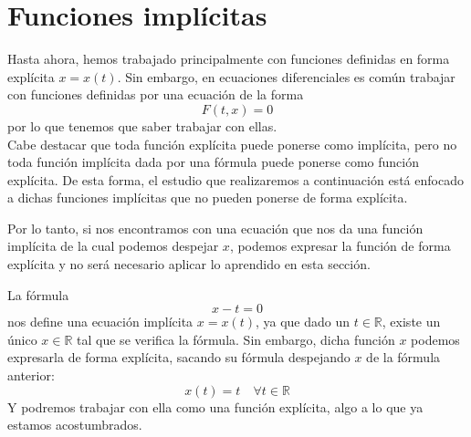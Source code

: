 \section{Funciones implícitas}
Hasta ahora, hemos trabajado principalmente con funciones definidas en forma explícita $x=x(t)$. Sin embargo, en ecuaciones diferenciales es común trabajar con funciones definidas por una ecuación de la forma
\begin{equation*}
    F(t,x) = 0
\end{equation*}
por lo que tenemos que saber trabajar con ellas.\\

Cabe destacar que toda función explícita puede ponerse como implícita, pero no toda función implícita dada por una fórmula puede ponerse como función explícita. De esta forma, el estudio que realizaremos a continuación está enfocado a dichas funciones implícitas que no pueden ponerse de forma explícita.

Por lo tanto, si nos encontramos con una ecuación que nos da una función implícita de la cual podemos despejar $x$, podemos expresar la función de forma explícita y no será necesario aplicar lo aprendido en esta sección.

\begin{ejemplo}
    La fórmula
    \begin{equation*}
        x-t = 0
    \end{equation*}
    nos define una ecuación implícita $x=x(t)$, ya que dado un $t\in \mathbb{R}$, existe un único $x\in \mathbb{R}$ tal que se verifica la fórmula. Sin embargo, dicha función $x$ podemos expresarla de forma explícita, sacando su fórmula despejando $x$ de la fórmula anterior:
    \begin{equation*}
        x(t) = t \quad \forall t\in \mathbb{R}
    \end{equation*}
    Y podremos trabajar con ella como una función explícita, algo a lo que ya estamos acostumbrados.
\end{ejemplo}

